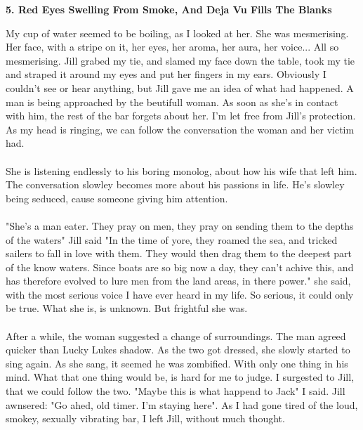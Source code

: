 \documentclass[]{article}
\begin{document}
\newpage 

\begin{center}
	\large\textbf{5. Red Eyes Swelling From Smoke, \newline And Deja Vu Fills The Blanks}
\end{center}

My cup of water seemed to be boiling, as I looked at her. She was mesmerising. Her face, with a stripe on it, her eyes, her aroma, her aura, her voice... All so mesmerising. Jill grabed my tie, and slamed my face down the table, took my tie and straped it around my eyes and put her fingers in my ears. Obviously I couldn't see or hear anything, but Jill gave me an idea of what had happened. A man is being approached by the beutifull woman. As soon as she's in contact with him, the rest of the bar forgets about her. I'm let free from Jill's protection. As my head is ringing, we can follow the conversation the woman and her victim had. 
\\ \\
She is listening endlessly to his boring monolog, about how his wife that left him. The conversation slowley becomes more about his passions in life. He's slowley being seduced, cause someone giving him attention.
\\ \\
"She's a man eater. They pray on men, they pray on sending them to the depths of the waters" Jill said "In the time of yore, they roamed the sea, and tricked sailers to fall in love with them. They would then drag them to the deepest part of the know waters. Since boats are so big now a day, they can't achive this, and has therefore evolved to lure men from the land areas, in there power." she said, with the most serious voice I have ever heard in my life. So serious, it could only be true. What she is, is unknown. But frightful she was. 
\\ \\
After a while, the woman suggested a change of surroundings. The man agreed quicker than Lucky Lukes shadow. As the two got dressed, she slowly started to sing again. As she sang, it seemed he was zombified. With only one thing in his mind. What that one thing would be, is hard for me to judge. I surgested to Jill, that we could follow the two. "Maybe this is what happend to Jack" I said. Jill awnsered: "Go ahed, old timer. I'm staying here". As I had gone tired of the loud, smokey, sexually vibrating bar, I left Jill, without much thought. 
\\ \\
\end{document}
